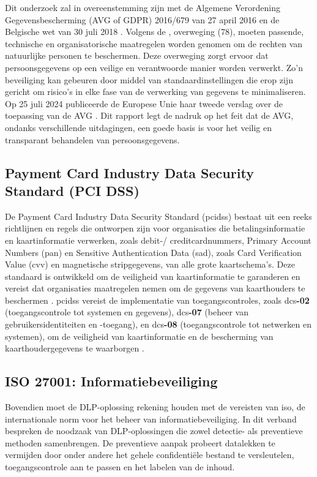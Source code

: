 Dit onderzoek zal in overeenstemming zijn met de Algemene Verordening Gegevensbescherming (AVG of GDPR) 2016/679 van 27 april 2016 \autocite{eu_avg2016} en de Belgische wet van 30 juli 2018 \autocite{BelgischeOverheid2018}.
Volgens de \textcite{eu_avg2016}, overweging (78), moeten passende, technische en organisatorische maatregelen worden genomen om de rechten van natuurlijke personen te beschermen. 
Deze overweging zorgt ervoor dat persoonsgegevens op een veilige en verantwoorde manier worden verwerkt. 
Zo'n beveiliging kan gebeuren door middel van standaardinstellingen die erop zijn gericht om risico's in elke fase van de verwerking van gegevens te minimaliseren.
Op 25 juli 2024 publiceerde de Europese Unie haar tweede verslag over de toepassing van de AVG \autocite{eu_avg2024}. 
Dit rapport legt de nadruk op het feit dat de AVG, ondanks verschillende uitdagingen, een goede basis is voor het veilig en transparant behandelen van persoonsgegevens. 


\subsection{Payment Card Industry Data Security Standard (PCI DSS)}%

De Payment Card Industry Data Security Stand\-ard (\gls{pcidss}) bestaat uit een reeks richtlijnen en regels die ontworpen zijn voor organisaties die betalingsinformatie en kaartinformatie verwerken, 
zoals debit-/ creditcardnummers, Primary Account Numbers (\gls{pan}) en Sensitive Authentication Data (\gls{sad}), zoals Card Verification Value (\gls{cvv}) en magnetische stripgegevens, van alle grote kaartsche\-ma's. 
Deze standaard is ontwikkeld om de veiligheid van kaartinformatie te garanderen en vereist dat organisaties maatregelen nemen om de gegevens van kaarthouders te beschermen \autocite{Elluri2018}. 
\gls{pcidss} vereist de implementatie van toegangscontroles, zoals \gls{dcs}\textbf{-02} (toegangscontrole tot systemen en gegevens), \gls{dcs}\textbf{-07} (beheer van gebruikersidentiteiten en -toegang), 
en \gls{dcs}\textbf{-08} (toegangscontrole tot netwerken en systemen), om de veiligheid van kaartinformatie en de bescherming van kaarthoudergegevens te waarborgen \autocite{Elluri2018}.

\subsection{ISO 27001: Informatiebeveiliging}%

Bovendien moet de DLP-oplossing rekening houden met de vereisten van \gls{iso}, de internationale norm voor het beheer van informatiebeveiliging. 
In dit verband bespreken \textcite{Alsanabani2020} de noodzaak van DLP-oploss\-ingen die zowel detectie- als preventieve methoden samenbrengen. 
De preventieve aanpak probeert datalekken te vermijden door onder andere het gehele confidentiële bestand te versleutelen, toegangscontrole aan te passen en het labelen van de inhoud.

